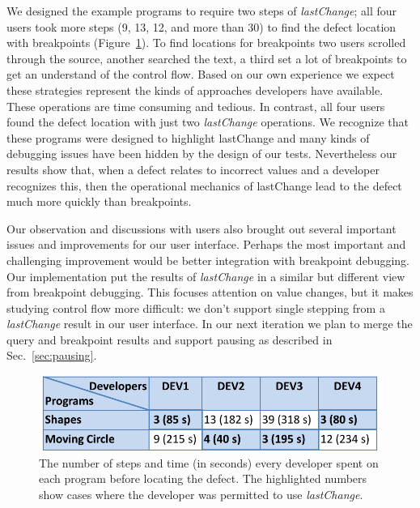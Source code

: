 \documentclass{sig-alternate}
\begin{document}
We designed the example programs to require two steps of \textit{lastChange}; 
all four users took more steps (9, 13, 12, and more than 30) to find the defect location with breakpoints (Figure~\ref{fig:userstudy}).  
To find locations for breakpoints two users scrolled through the source, 
another searched the text, a third set a lot of breakpoints to get an understand of the control flow. 
Based on our own experience we expect these strategies represent the kinds of approaches 
developers have available. These operations are time consuming and tedious. In contrast, all four users 
found the defect location with just two \textit{lastChange} operations.
We recognize that these programs were designed to highlight lastChange and many kinds of debugging 
issues have been hidden by the design of our tests. Nevertheless our results show that, when a defect 
relates to incorrect values and a developer recognizes this, then the operational 
mechanics of lastChange lead to the defect much more quickly than breakpoints.

Our observation and discussions with users also brought out several important issues and improvements
for our user interface. Perhaps the most important and challenging improvement would be better integration 
with breakpoint debugging. Our implementation put the results of \textit{lastChange} in a similar but different
view from breakpoint debugging. This focuses attention on value changes, but it makes studying control 
flow more difficult: we don't support single stepping from a \textit{lastChange} result in our user interface. In our next iteration we 
plan to merge the query and breakpoint results and support pausing as described in Sec.~\ref{sec:pausing}.


\begin{figure}[htp]
\centering 
\includegraphics[width=.48\textwidth]{10-userstudy.pdf}
\caption{The number of steps and time (in seconds) every developer spent on each program
before locating the defect. The highlighted numbers show cases where the developer was
permitted to use \textit{lastChange}.}
\label{fig:userstudy}
\end{figure}
\end{document}
